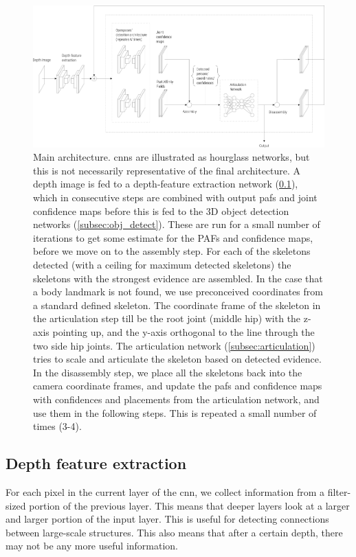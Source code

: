 \begin{figure}[h]
  \centering
  \includegraphics[width=\textwidth]{img/architecture_main}
  \caption[Main architecture]{Main architecture. \gls{cnn}s are illustrated as hourglass networks, but this is not necessarily representative of the final architecture. A depth image is fed to a depth-feature extraction network (\ref{subsec:depth_feature}), which in consecutive steps are combined with output \gls{paf}s and joint confidence maps before this is fed to the 3D object detection networks (\ref{subsec:obj_detect}). These are run for a small number of iterations to get some estimate for the PAFs and confidence maps, before we move on to the assembly step. For each of the skeletons detected (with a ceiling for maximum detected skeletons) the skeletons with the strongest evidence are assembled. In the case that a body landmark is not found, we use preconceived coordinates from a standard defined skeleton. The coordinate frame of the skeleton in the articulation step till be the root joint (middle hip) with the z-axis pointing up, and the y-axis orthogonal to the line through the two side hip joints. The articulation network (\ref{subsec:articulation}) tries to scale and articulate the skeleton based on detected evidence. In the disassembly step, we place all the skeletons back into the camera coordinate frames, and update the \gls{paf}s and confidence maps with confidences and placements from the articulation network, and use them in the following steps. This is repeated a small number of times (3-4).}
  \label{fig:arch_main}
\end{figure}

\subsection{Depth feature extraction}\label{subsec:depth_feature}
For each pixel in the current layer of the \gls{cnn}, we collect information from a filter-sized portion of the previous layer. This means that deeper layers look at a larger and larger portion of the input layer. This is useful for detecting connections between large-scale structures. This also means that after a certain depth, there may not be any more useful information.

